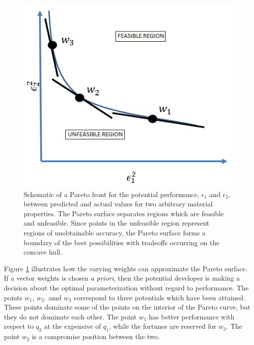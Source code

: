 \begin{figure}[!htbp]
	\centering
  \includegraphics{chapter3/pareto_schematic}
  \caption{Schematic of a Pareto front for the potential performance, $\epsilon_1$ and $\epsilon_2$, between predicted and actual values for two arbitrary material properties.  The Pareto surface separates regions which are feasible and unfeasible.  Since points in the unfeasible region represent regions of unobtainable accuracy, the Pareto surface forms a boundary of the best possibilities with tradeoffs occurring on the concave hull.}
  \label{fig:pareto_concave}
\end{figure}

Figure \ref{fig:pareto_concave} illustrates how the varying weights can approximate the Pareto surface.  If a vector weights is chosen \emph{a priori}, then the potential developer is making a decision about the optimal parameterization without regard to performance.  The points $w_1$, $w_2$. amd $w_3$ correspond to three potentials which have been attained. These points dominate some of the points on the interior of the Pareto curve, but they do not dominate each other.  The point $w_1$ has better performance with respect to $q_2$ at the expensive of $q_1$, while the fortunes are reserved for $w_3$.  The point $w_2$ is a compromise position between the two.

